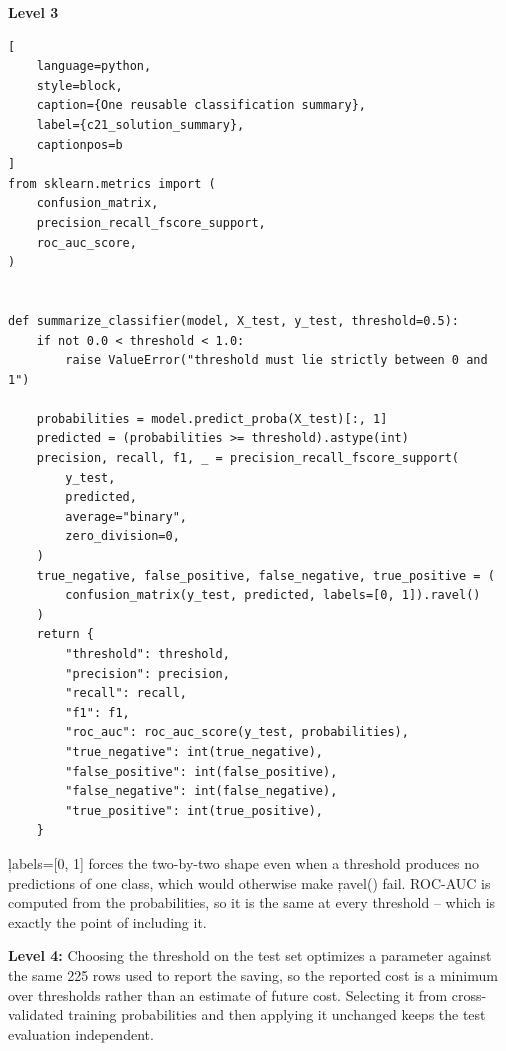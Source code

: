 \textbf{Level 3}

\begin{lstlisting}[
    language=python,
    style=block,
    caption={One reusable classification summary},
    label={c21_solution_summary},
    captionpos=b
]
from sklearn.metrics import (
    confusion_matrix,
    precision_recall_fscore_support,
    roc_auc_score,
)


def summarize_classifier(model, X_test, y_test, threshold=0.5):
    if not 0.0 < threshold < 1.0:
        raise ValueError("threshold must lie strictly between 0 and 1")

    probabilities = model.predict_proba(X_test)[:, 1]
    predicted = (probabilities >= threshold).astype(int)
    precision, recall, f1, _ = precision_recall_fscore_support(
        y_test,
        predicted,
        average="binary",
        zero_division=0,
    )
    true_negative, false_positive, false_negative, true_positive = (
        confusion_matrix(y_test, predicted, labels=[0, 1]).ravel()
    )
    return {
        "threshold": threshold,
        "precision": precision,
        "recall": recall,
        "f1": f1,
        "roc_auc": roc_auc_score(y_test, probabilities),
        "true_negative": int(true_negative),
        "false_positive": int(false_positive),
        "false_negative": int(false_negative),
        "true_positive": int(true_positive),
    }
\end{lstlisting}

\c{labels=[0, 1]} forces the two-by-two shape even when a threshold produces no
predictions of one class, which would otherwise make \c{ravel()} fail. ROC-AUC is
computed from the probabilities, so it is the same at every threshold -- which is
exactly the point of including it.

\textbf{Level 4:} Choosing the threshold on the test set optimizes a parameter
against the same 225 rows used to report the saving, so the reported cost is a
minimum over thresholds rather than an estimate of future cost. Selecting it from
cross-validated training probabilities and then applying it unchanged keeps the
test evaluation independent.


